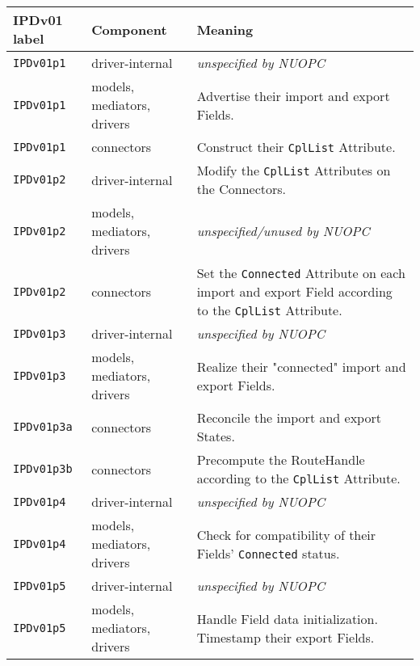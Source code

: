 \vspace*{3ex}
\begin{longtable}[h]{|p{35mm}|p{4cm}|p{6cm}|}
     \hline\hline
     {\bf IPDv01 label} & {\bf Component} & {\bf Meaning}\\
     \hline\hline
     {\tt IPDv01p1} & driver-internal             & {\em unspecified by NUOPC}\\ \hline
     {\tt IPDv01p1} & models, mediators, drivers  & Advertise their import and export Fields.\\ \hline
     {\tt IPDv01p1} & connectors                  & Construct their {\tt CplList} Attribute.\\ \hline
     {\tt IPDv01p2} & driver-internal             & Modify the {\tt CplList} Attributes on the Connectors.\\ \hline
     {\tt IPDv01p2} & models, mediators, drivers  & {\em unspecified/unused by NUOPC}\\ \hline
     {\tt IPDv01p2} & connectors                  & Set the {\tt Connected} Attribute on each import and export Field according to the {\tt CplList} Attribute.\\ \hline
     {\tt IPDv01p3} & driver-internal             & {\em unspecified by NUOPC}\\ \hline
     {\tt IPDv01p3} & models, mediators, drivers  & Realize their "connected" import and export Fields.\\ \hline
     {\tt IPDv01p3a}& connectors                  & Reconcile the import and export States.\\ \hline
     {\tt IPDv01p3b}& connectors                  & Precompute the RouteHandle according to the {\tt CplList} Attribute.\\ \hline
     {\tt IPDv01p4} & driver-internal             & {\em unspecified by NUOPC}\\ \hline
     {\tt IPDv01p4} & models, mediators, drivers  & Check for compatibility of their Fields' {\tt Connected} status.\\ \hline
     {\tt IPDv01p5} & driver-internal             & {\em unspecified by NUOPC}\\ \hline
     {\tt IPDv01p5} & models, mediators, drivers  & Handle Field data initialization. Timestamp their export Fields.\\
     \hline\hline
\end{longtable}


